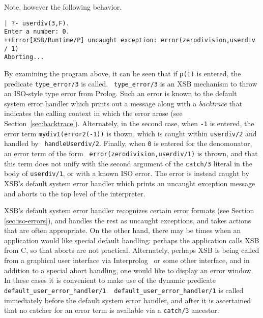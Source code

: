 \noindent
Note, however the following behavior.

\begin{small}
\begin{verbatim}
| ?- userdiv(3,F).
Enter a number: 0.
++Error[XSB/Runtime/P] uncaught exception: error(zerodivision,userdiv / 1)
Aborting...
\end{verbatim}
\end{small}

\noindent
By examining the program above, it can be seen that if {\tt p(1)} is
entered, the predicate {\tt type\_error/3} is called.  {\tt
  type\_error/3} is an XSB mechanism to throw an ISO-style type error
from Prolog.  Such an error is known to the default system error
handler which prints out a message along with a {\em backtrace} that
indicates the calling context in which the error arose (see
Section~\ref{sec:backtrace}).  Alternately, in the second case, when
{\tt -1} is entered, the error term {\tt mydiv1(error2(-1))} is thown,
which is caught within {\tt userdiv/2} and handled by {\tt
  handleUserdiv/2}.  Finally, when {\tt 0} is entered for the
denomonator, an error term of the form {\tt
  error(zerodivision,userdiv/1)} is thrown, and that this term does
not unify with the second argument of the {\tt catch/3} literal in the
body of {\tt userdiv/1}, or with a known ISO error.  The error is
instead caught by XSB's default system error handler which prints an
uncaught exception message and aborts to the top level of the
interpreter.  

XSB's default system error handler recognizes certain error formats
(see Section \ref{sec:iso-errors}), and handles the rest as uncaught
exceptions, and takes actions that are often appropriate.  On the
other hand, there may be times when an application would like special
default handling: perhaps the application calls XSB from C, so that
aborts are not practical.  Alternately, perhaps XSB is being called
from a graphical user interface via Interprolog~\cite{Cale01} or some
other interface, and in addition to a special abort handling, one
would like to display an error window.  In these cases it is
convenient to make use of the dynamic predicate {\tt
  default\_user\_error\_handler/1}.  {\tt
  default\_user\_error\_handler/1} is called immediately before the
default system error handler, and after it is ascertained that no
catcher for an error term is available via a {\tt catch/3} ancestor.

